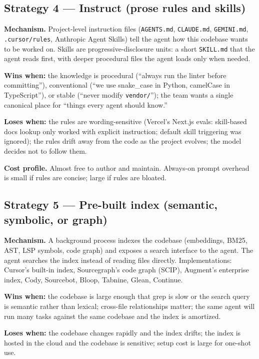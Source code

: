 \documentclass[
  11pt,
  letterpaper,
  numbers=noendperiod,
  parskip=half]{scrartcl}
\begin{document}
\subsection{Strategy 4 --- Instruct (prose rules and skills)}
\label{sec-strat-instruct}

\textbf{Mechanism.} Project-level instruction files
(\texttt{AGENTS.md}, \texttt{CLAUDE.md}, \texttt{GEMINI.md},
\texttt{.cursor/rules}, Anthropic Agent Skills) tell the agent how this
codebase wants to be worked on. Skills are progressive-disclosure
units: a short \texttt{SKILL.md} that the agent reads first, with
deeper procedural files the agent loads only when needed.

\textbf{Wins when:} the knowledge is procedural (``always run the
linter before committing''), conventional (``we use snake\_case in
Python, camelCase in TypeScript''), or stable (``never modify
\texttt{vendor/}''); the team wants a single canonical place for
``things every agent should know.''

\textbf{Loses when:} the rules are wording-sensitive (Vercel's Next.js
evals: skill-based docs lookup only worked with explicit instruction;
default skill triggering was ignored); the rules drift away from the
code as the project evolves; the model decides not to follow them.

\textbf{Cost profile.} Almost free to author and maintain. Always-on
prompt overhead is small if rules are concise; large if rules are bloated.

\subsection{Strategy 5 --- Pre-built index (semantic, symbolic, or
graph)}\label{sec-strat-index}

\textbf{Mechanism.} A background process indexes the codebase
(embeddings, BM25, AST, LSP symbols, code graph) and exposes a search
interface to the agent. The agent searches the index instead of reading
files directly. Implementations: Cursor's built-in index, Sourcegraph's
code graph (SCIP), Augment's enterprise index, Cody, Sourcebot, Bloop,
Tabnine, Glean, Continue.

\textbf{Wins when:} the codebase is large enough that grep is slow or
the search query is semantic rather than lexical; cross-file
relationships matter; the same agent will run many tasks against the
same codebase and the index is amortized.

\textbf{Loses when:} the codebase changes rapidly and the index drifts;
the index is hosted in the cloud and the codebase is sensitive; setup
cost is large for one-shot use.
\end{document}
